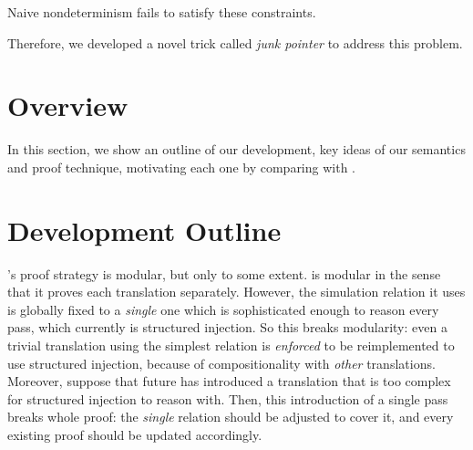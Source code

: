 {Naive nondeterminism fails to satisfy these constraints.

Therefore, we developed a novel trick called \textit{junk pointer} to address this problem.





























\section{Overview}\label{sec:overview}
In this section, we show an outline of our development, key ideas of our semantics and proof technique, motivating each one by comparing with \ccc{}.

\section{Development Outline}\label{sec:overview:outline}


\ccc{}'s proof strategy is modular, but only to some extent.%
\ccc{} is modular in the sense that it proves each translation separately.
However, the simulation relation it uses is globally fixed to a \textit{single} one which is sophisticated enough to reason every pass, which currently is structured injection.
So this breaks modularity: even a trivial translation using the simplest relation is \textit{enforced} to be reimplemented to use structured injection, because of compositionality with \textit{other} translations.
Moreover, suppose that future \cc{} has introduced a translation that is too complex for structured injection to reason with.
Then, this introduction of a single pass breaks whole proof: the \textit{single} relation should be adjusted to cover it, and every existing proof should be updated accordingly.

}
